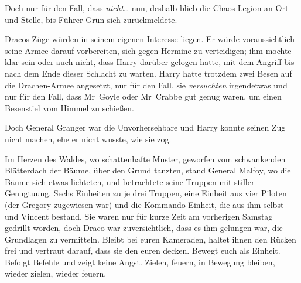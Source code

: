 Doch nur für den Fall, dass \emph{nicht…} nun, deshalb blieb die Chaos-Legion an Ort und Stelle, bis Führer Grün sich zurückmeldete.

Dracos Züge würden in seinem eigenen Interesse liegen. Er würde voraussichtlich seine Armee darauf vorbereiten, sich gegen Hermine zu verteidigen; ihm mochte klar sein oder auch nicht, dass Harry darüber gelogen hatte, mit dem Angriff bis nach dem Ende dieser Schlacht zu warten. Harry hatte trotzdem zwei Besen auf die Drachen-Armee angesetzt, nur für den Fall, sie \emph{versuchten} irgendetwas und nur für den Fall, dass Mr~Goyle oder Mr~Crabbe gut genug waren, um einen Besenstiel vom Himmel zu schießen.

Doch General Granger war die Unvorhersehbare und Harry konnte seinen Zug nicht machen, ehe er nicht wusste, wie sie zog.

\later

Im Herzen des Waldes, wo schattenhafte Muster, geworfen vom schwankenden Blätterdach der Bäume, über den Grund tanzten, stand General Malfoy, wo die Bäume sich etwas lichteten, und betrachtete seine Truppen mit stiller Genugtuung. Sechs Einheiten zu je drei Truppen, eine Einheit aus vier Piloten (der Gregory zugewiesen war) und die Kommando-Einheit, die aus ihm selbst und Vincent bestand. Sie waren nur für kurze Zeit am vorherigen Samstag gedrillt worden, doch Draco war zuversichtlich, dass es ihm gelungen war, die Grundlagen zu vermitteln. Bleibt bei euren Kameraden, haltet ihnen den Rücken frei und vertraut darauf, dass sie den euren decken. Bewegt euch als Einheit. Befolgt Befehle und zeigt keine Angst. Zielen, feuern, in Bewegung bleiben, wieder zielen, wieder feuern.

